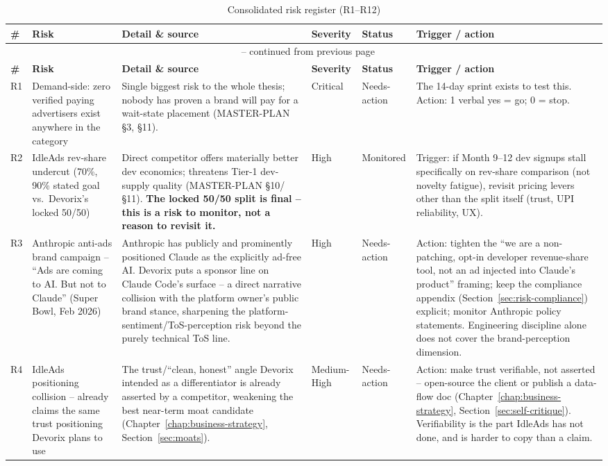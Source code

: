 \begin{longtable}{@{}p{0.6cm}p{3.6cm}p{4.6cm}p{1.5cm}p{1.7cm}p{3.6cm}@{}}
\caption{Consolidated risk register (R1--R12)}
\label{tab:risk-register} \\
\toprule
\textbf{\#} & \textbf{Risk} & \textbf{Detail \& source} & \textbf{Severity} & \textbf{Status} & \textbf{Trigger / action} \\
\midrule
\endfirsthead
\multicolumn{6}{c}{\tablename\ \thetable{} -- continued from previous page} \\
\toprule
\textbf{\#} & \textbf{Risk} & \textbf{Detail \& source} & \textbf{Severity} & \textbf{Status} & \textbf{Trigger / action} \\
\midrule
\endhead
R1 & Demand-side: zero verified paying advertisers exist anywhere in the category & Single biggest risk to the whole thesis; nobody has proven a brand will pay for a wait-state placement (MASTER-PLAN \S3, \S11). & Critical & Needs-action & The 14-day sprint exists to test this. Action: 1 verbal yes = go; 0 = stop. \\
R2 & IdleAds rev-share undercut (70\%, 90\% stated goal vs.\ Devorix's locked 50/50) & Direct competitor offers materially better dev economics; threatens Tier-1 dev-supply quality (MASTER-PLAN \S10/\S11). \textbf{The locked 50/50 split is final -- this is a risk to monitor, not a reason to revisit it.} & High & Monitored & Trigger: if Month 9--12 dev signups stall specifically on rev-share comparison (not novelty fatigue), revisit pricing levers other than the split itself (trust, UPI reliability, UX). \\
R3 & Anthropic anti-ads brand campaign -- ``Ads are coming to AI. But not to Claude'' (Super Bowl, Feb 2026) & Anthropic has publicly and prominently positioned Claude as the explicitly ad-free AI. Devorix puts a sponsor line on Claude Code's surface -- a direct narrative collision with the platform owner's public brand stance, sharpening the platform-sentiment/ToS-perception risk beyond the purely technical ToS line. & High & Needs-action & Action: tighten the ``we are a non-patching, opt-in developer revenue-share tool, not an ad injected into Claude's product'' framing; keep the compliance appendix (Section~\ref{sec:risk-compliance}) explicit; monitor Anthropic policy statements. Engineering discipline alone does not cover the brand-perception dimension. \\
R4 & IdleAds positioning collision -- already claims the same trust positioning Devorix plans to use & The trust/``clean, honest'' angle Devorix intended as a differentiator is already asserted by a competitor, weakening the best near-term moat candidate (Chapter~\ref{chap:business-strategy}, Section~\ref{sec:moats}). & Medium-High & Needs-action & Action: make trust verifiable, not asserted -- open-source the client or publish a data-flow doc (Chapter~\ref{chap:business-strategy}, Section~\ref{sec:self-critique}). Verifiability is the part IdleAds has not done, and is harder to copy than a claim. \\

\end{longtable}
